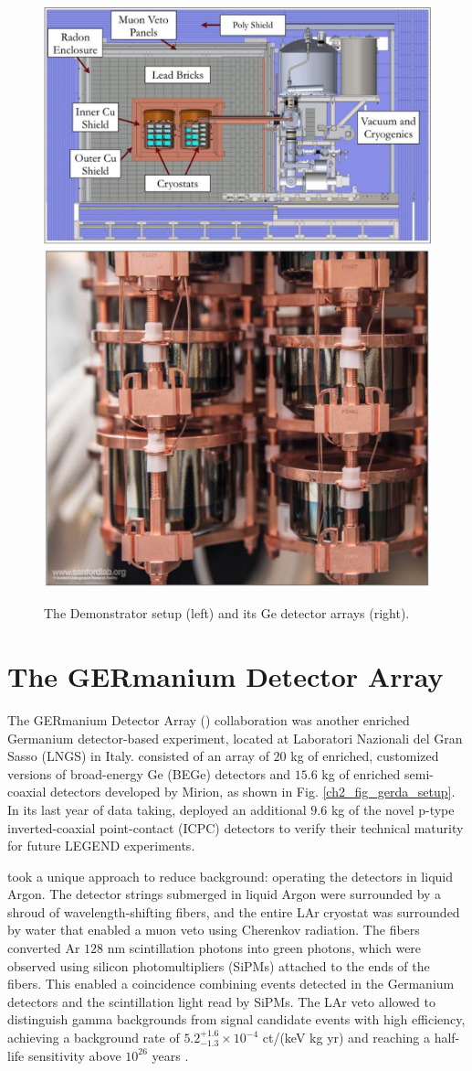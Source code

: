 \begin{figure}
  \centering
  \includegraphics[height=0.34\columnwidth]{ch2/figs/mjd_setup.pdf}
  \qquad
  \includegraphics[height=0.34\columnwidth]{ch2/figs/mjd_ppc_array.pdf}
  \caption{The {\MJ} Demonstrator setup (left) and its Ge detector arrays (right).}
    \label{fig:mjd}
  \end{figure}
 
\section{The GERmanium Detector Array}

The GERmanium Detector Array ({\Gerda}) collaboration was another enriched Germanium detector-based experiment, located at Laboratori Nazionali del Gran Sasso (LNGS) in Italy. {\Gerda} consisted of an array of $20$ kg of enriched, customized versions of broad-energy Ge (BEGe) detectors and $15.6$ kg of enriched semi-coaxial detectors developed by Mirion, as shown in Fig. \ref{ch2_fig_gerda_setup}. In its last year of data taking, {\Gerda} deployed an additional $9.6$ kg of the novel p-type inverted-coaxial point-contact (ICPC) detectors to verify their technical maturity for future LEGEND experiments.

{\Gerda} took a unique approach to reduce background: operating the detectors in liquid Argon. The detector strings submerged in liquid Argon were surrounded by a shroud of wavelength-shifting fibers, and the entire LAr cryostat was surrounded by water that enabled a muon veto using Cherenkov radiation. The fibers converted Ar $128$ nm scintillation photons into green photons, which were observed using silicon photomultipliers (SiPMs) attached to the ends of the fibers. This enabled a coincidence combining events detected in the Germanium detectors and the scintillation light read by SiPMs. The LAr veto allowed {\Gerda} to distinguish gamma backgrounds from {\onbb} signal candidate events with high efficiency, achieving a background rate of $5.2^{+1.6}_{-1.3}\times 10^{-4}$ ct/(keV kg yr) and reaching a half-life sensitivity above $10^{26}$ years \cite{GERDA_final}.

